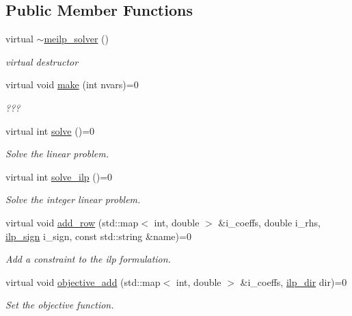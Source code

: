 \subsection*{Public Member Functions}
\begin{DoxyCompactItemize}
\item 
virtual \hyperlink{classmeilp__solver_aeffc63d25af700718897972f6f5dbff6}{$\sim$meilp\+\_\+solver} ()
\begin{DoxyCompactList}\small\item\em virtual destructor \end{DoxyCompactList}\item 
virtual void \hyperlink{classmeilp__solver_a8cde2beaa61da22aaec664f3f9a0d253}{make} (int nvars)=0
\begin{DoxyCompactList}\small\item\em ??? \end{DoxyCompactList}\item 
virtual int \hyperlink{classmeilp__solver_ac042de10d65f792cc6ef6020b8451837}{solve} ()=0
\begin{DoxyCompactList}\small\item\em Solve the linear problem. \end{DoxyCompactList}\item 
virtual int \hyperlink{classmeilp__solver_aec926409e78f416d3272cb8f3ef1e1c0}{solve\+\_\+ilp} ()=0
\begin{DoxyCompactList}\small\item\em Solve the integer linear problem. \end{DoxyCompactList}\item 
virtual void \hyperlink{classmeilp__solver_a844cb83be66ee0afe42edc2a60fd17cf}{add\+\_\+row} (std\+::map$<$ int, double $>$ \&i\+\_\+coeffs, double i\+\_\+rhs, \hyperlink{classmeilp__solver_a2cb689f3c242a34eb05cff99704a3e8e}{ilp\+\_\+sign} i\+\_\+sign, const std\+::string \&name)=0
\begin{DoxyCompactList}\small\item\em Add a constraint to the ilp formulation. \end{DoxyCompactList}\item 
virtual void \hyperlink{classmeilp__solver_a6478c7167ffb9c270104ba07cc102c58}{objective\+\_\+add} (std\+::map$<$ int, double $>$ \&i\+\_\+coeffs, \hyperlink{classmeilp__solver_a2f719db6577d73007d942af7e6fe907c}{ilp\+\_\+dir} dir)=0
\begin{DoxyCompactList}\small\item\em Set the objective function. \end{DoxyCompactList}\item 

\end{DoxyCompactItemize}
